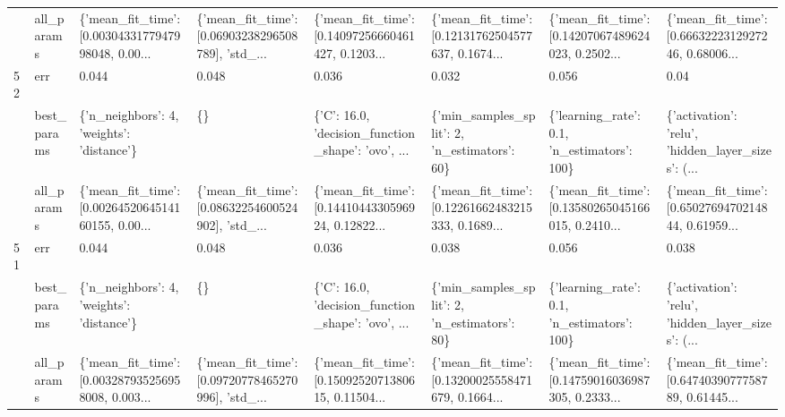 \begin{tabular}{llllllll}
   & all\_params &  \{'mean\_fit\_time': [0.0030433177947998048, 0.00... &  \{'mean\_fit\_time': [0.06903238296508789], 'std\_... &  \{'mean\_fit\_time': [0.14097256660461427, 0.1203... &  \{'mean\_fit\_time': [0.12131762504577637, 0.1674... &  \{'mean\_fit\_time': [0.14207067489624023, 0.2502... &  \{'mean\_fit\_time': [0.6663222312927246, 0.68006... \\
52 & err &                                              0.044 &                                              0.048 &                                              0.036 &                                              0.032 &                                              0.056 &                                               0.04 \\
   & best\_params &          \{'n\_neighbors': 4, 'weights': 'distance'\} &                                                 \{\} &  \{'C': 16.0, 'decision\_function\_shape': 'ovo', ... &       \{'min\_samples\_split': 2, 'n\_estimators': 60\} &        \{'learning\_rate': 0.1, 'n\_estimators': 100\} &  \{'activation': 'relu', 'hidden\_layer\_sizes': (... \\
   & all\_params &  \{'mean\_fit\_time': [0.0026452064514160155, 0.00... &  \{'mean\_fit\_time': [0.08632254600524902], 'std\_... &  \{'mean\_fit\_time': [0.1441044330596924, 0.12822... &  \{'mean\_fit\_time': [0.12261662483215333, 0.1689... &  \{'mean\_fit\_time': [0.13580265045166015, 0.2410... &  \{'mean\_fit\_time': [0.6502769470214844, 0.61959... \\
51 & err &                                              0.044 &                                              0.048 &                                              0.036 &                                              0.038 &                                              0.056 &                                              0.038 \\
   & best\_params &          \{'n\_neighbors': 4, 'weights': 'distance'\} &                                                 \{\} &  \{'C': 16.0, 'decision\_function\_shape': 'ovo', ... &       \{'min\_samples\_split': 2, 'n\_estimators': 80\} &        \{'learning\_rate': 0.1, 'n\_estimators': 100\} &  \{'activation': 'relu', 'hidden\_layer\_sizes': (... \\
   & all\_params &  \{'mean\_fit\_time': [0.003287935256958008, 0.003... &  \{'mean\_fit\_time': [0.09720778465270996], 'std\_... &  \{'mean\_fit\_time': [0.1509252071380615, 0.11504... &  \{'mean\_fit\_time': [0.13200025558471679, 0.1664... &  \{'mean\_fit\_time': [0.14759016036987305, 0.2333... &  \{'mean\_fit\_time': [0.6474039077758789, 0.61445... \\
\bottomrule
\end{tabular}
